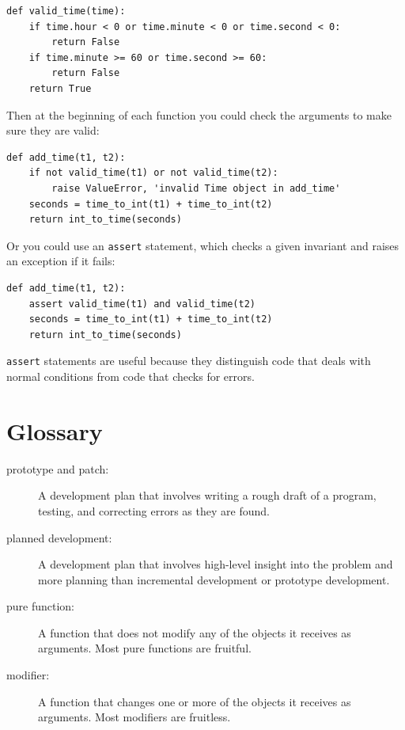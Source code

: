 \documentclass[10pt]{book}
\begin{document}
\begin{CJK}{UTF8}{gbsn}
\begin{verbatim}
def valid_time(time):
    if time.hour < 0 or time.minute < 0 or time.second < 0:
        return False
    if time.minute >= 60 or time.second >= 60:
        return False
    return True
\end{verbatim}
%
Then at the beginning of each function you could check the
arguments to make sure they are valid:

\begin{verbatim}
def add_time(t1, t2):
    if not valid_time(t1) or not valid_time(t2):
        raise ValueError, 'invalid Time object in add_time'
    seconds = time_to_int(t1) + time_to_int(t2)
    return int_to_time(seconds)
\end{verbatim}
%
Or you could use an {\tt assert} statement, which checks a given invariant
and raises an exception if it fails:

\begin{verbatim}
def add_time(t1, t2):
    assert valid_time(t1) and valid_time(t2)
    seconds = time_to_int(t1) + time_to_int(t2)
    return int_to_time(seconds)
\end{verbatim}
%
{\tt assert} statements are useful because they distinguish
code that deals with normal conditions from code
that checks for errors.


\section{Glossary}

\begin{description}

\item[prototype and patch:] A development plan that involves
writing a rough draft of a program, testing, and correcting errors as
they are found.

\item[planned development:] A development plan that involves
high-level insight into the problem and more planning than incremental
development or prototype development.

\item[pure function:] A function that does not modify any of the objects it
receives as arguments.  Most pure functions are fruitful.

\item[modifier:] A function that changes one or more of the objects it
receives as arguments.  Most modifiers are fruitless.


\end{description}
\end{CJK}
\end{document}
